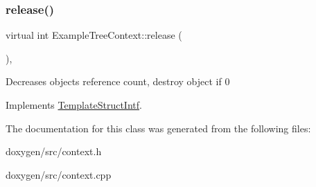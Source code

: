 \mbox{\label{class_example_tree_context_af1d94cfff79db89a390eb189ebe9d15b}} 
\subsubsection{\texorpdfstring{release()}{release()}}
{\footnotesize\ttfamily virtual int Example\+Tree\+Context\+::release (\begin{DoxyParamCaption}{ }\end{DoxyParamCaption})\hspace{0.3cm}{\ttfamily [inline]}, {\ttfamily [virtual]}}

Decreases object\textquotesingle{}s reference count, destroy object if 0 

Implements \mbox{\hyperlink{class_template_struct_intf_a3dce7dd29d3f66a8080b40578e8a5045}{Template\+Struct\+Intf}}.



The documentation for this class was generated from the following files\+:\begin{DoxyCompactItemize}
\item 
doxygen/src/context.\+h\item 
doxygen/src/context.\+cpp\end{DoxyCompactItemize}
